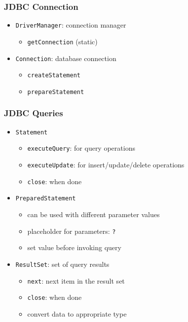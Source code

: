 \documentclass[dvipsnames]{beamer}
\theoremstyle{plain}
\begin{document}
\begin{frame}
  \frametitle{JDBC Connection}

  \begin{itemize}
    \item \lstinline!DriverManager!: connection manager
    \begin{itemize}
      \item \lstinline!getConnection! (static)
    \end{itemize}

    \pause
    \medskip
    \item \lstinline!Connection!: database connection
    \begin{itemize}
      \item \lstinline!createStatement!
      \item \lstinline!prepareStatement!
    \end{itemize}
  \end{itemize}
\end{frame}

\begin{frame}
  \frametitle{JDBC Queries}

  \begin{itemize}
    \item \lstinline!Statement!
    \begin{itemize}
      \item \lstinline!executeQuery!: for query operations
      \item \lstinline!executeUpdate!: for insert/update/delete operations
      \item \lstinline!close!: when done
    \end{itemize}

    \pause
    \medskip
    \item \lstinline!PreparedStatement!
    \begin{itemize}
      \item can be used with different parameter values
      \item placeholder for parameters: \lstinline!?!
      \item set value before invoking query
    \end{itemize}

    \pause
    \medskip
    \item \lstinline!ResultSet!: set of query results
    \begin{itemize}
      \item \lstinline!next!: next item in the result set
      \item \lstinline!close!: when done
      \item convert data to appropriate type
    \end{itemize}
  \end{itemize}
\end{frame}
\end{document}
